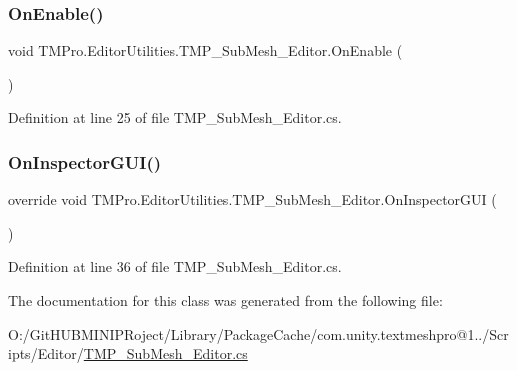 \subsubsection{\texorpdfstring{OnEnable()}{OnEnable()}}
{\footnotesize\ttfamily void T\+M\+Pro.\+Editor\+Utilities.\+T\+M\+P\+\_\+\+Sub\+Mesh\+\_\+\+Editor.\+On\+Enable (\begin{DoxyParamCaption}{ }\end{DoxyParamCaption})}



Definition at line 25 of file T\+M\+P\+\_\+\+Sub\+Mesh\+\_\+\+Editor.\+cs.

\mbox{\label{class_t_m_pro_1_1_editor_utilities_1_1_t_m_p___sub_mesh___editor_add035dbc8fab6591f58aab5801dad898}} 
\subsubsection{\texorpdfstring{OnInspectorGUI()}{OnInspectorGUI()}}
{\footnotesize\ttfamily override void T\+M\+Pro.\+Editor\+Utilities.\+T\+M\+P\+\_\+\+Sub\+Mesh\+\_\+\+Editor.\+On\+Inspector\+G\+UI (\begin{DoxyParamCaption}{ }\end{DoxyParamCaption})}



Definition at line 36 of file T\+M\+P\+\_\+\+Sub\+Mesh\+\_\+\+Editor.\+cs.



The documentation for this class was generated from the following file\+:\begin{DoxyCompactItemize}
\item 
O\+:/\+Git\+H\+U\+B\+M\+I\+N\+I\+P\+Roject/\+Library/\+Package\+Cache/com.\+unity.\+textmeshpro@1../\+Scripts/\+Editor/\mbox{\hyperlink{_t_m_p___sub_mesh___editor_8cs}{T\+M\+P\+\_\+\+Sub\+Mesh\+\_\+\+Editor.\+cs}}\end{DoxyCompactItemize}
